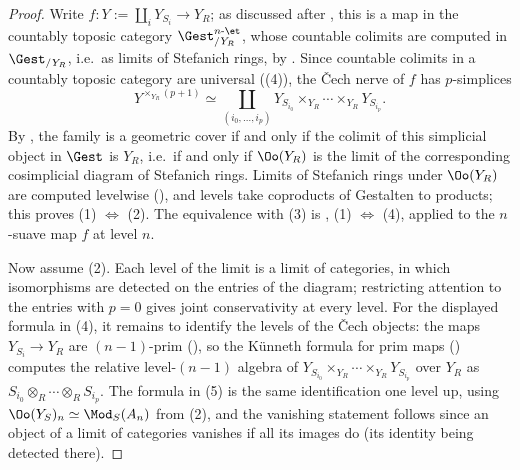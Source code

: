 	\begin{proof}
		Write $f\colon Y := \coprod_i Y_{S_i} \to Y_R$; as discussed after , this is a map in the countably toposic category $\Gest^{n\text{-}\et}_{/Y_R}$, whose countable colimits are computed in $\Gest_{/Y_R}$, i.e.\ as limits of Stefanich rings, by . Since countable colimits in a countably toposic category are universal ((4)), the Čech nerve of $f$ has $p$-simplices
		\[
			Y^{\times_{Y_R}(p+1)} \simeq \coprod_{(i_0,\dots,i_p)} Y_{S_{i_0}} \times_{Y_R} \cdots \times_{Y_R} Y_{S_{i_p}}.
		\]
		By , the family is a geometric cover if and only if the colimit of this simplicial object in $\Gest$ is $Y_R$, i.e.\ if and only if $\Oo(Y_R)$ is the limit of the corresponding cosimplicial diagram of Stefanich rings. Limits of Stefanich rings under $\Oo(Y_R)$ are computed levelwise (), and levels take coproducts of Gestalten to products; this proves (1) $\Leftrightarrow$ (2). The equivalence with (3) is , (1) $\Leftrightarrow$ (4), applied to the $n$-suave map $f$ at level $n$.

		Now assume (2). Each level of the limit is a limit of categories, in which isomorphisms are detected on the entries of the diagram; restricting attention to the entries with $p = 0$ gives joint conservativity at every level. For the displayed formula in (4), it remains to identify the levels of the Čech objects: the maps $Y_{S_i} \to Y_R$ are $(n-1)$-prim (), so the Künneth formula for prim maps () computes the relative level-$(n-1)$ algebra of $Y_{S_{i_0}} \times_{Y_R} \cdots \times_{Y_R} Y_{S_{i_p}}$ over $Y_R$ as $S_{i_0} \otimes_R \cdots \otimes_R S_{i_p}$. The formula in (5) is the same identification one level up, using $\Oo(Y_{S})_{n} \simeq \Mod_S(A_{n})$ from (2), and the vanishing statement follows since an object of a limit of categories vanishes if all its images do (its identity being detected there).
	\end{proof}

